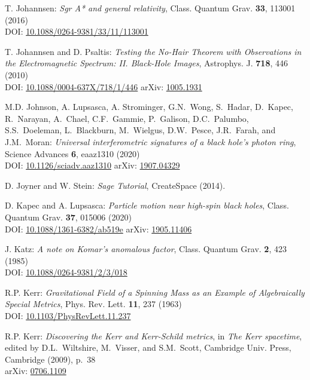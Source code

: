 \begin{thebibliography}{123}
T. Johannsen:
{\em Sgr A* and general relativity},
Class. Quantum Grav.  {\bf 33}, 113001 (2016)\\
DOI: \href{https://doi.org/10.1088/0264-9381/33/11/113001}{10.1088/0264-9381/33/11/113001}

T. Johannsen and D. Psaltis:
{\em Testing the No-Hair Theorem with Observations in the Electromagnetic Spectrum: II. Black-Hole Images},
Astrophys. J. {\bf 718}, 446 (2010)\\
DOI: \href{https://doi.org/10.1088/0004-637X/718/1/446}{10.1088/0004-637X/718/1/446}\hfill
arXiv: \href{https://arxiv.org/abs/1005.1931}{1005.1931}

M.D. Johnson, A. Lupsasca, A. Strominger, G.N.~Wong, S.~Hadar, D.~Kapec, R.~Narayan, A.~Chael,
C.F.~Gammie, P.~Galison, D.C.~Palumbo, S.S.~Doeleman, L.~Blackburn, M.~Wielgus, D.W.~Pesce,
J.R.~Farah, and J.M.~Moran:
{\em Universal interferometric signatures of a black hole's photon ring},
Science Advances {\bf 6}, eaaz1310 (2020)\\
DOI: \href{https://doi.org/10.1126/sciadv.aaz1310}{10.1126/sciadv.aaz1310}\hfill
arXiv: \href{https://arxiv.org/abs/1907.04329}{1907.04329}

D. Joyner and W. Stein: {\em Sage Tutorial}, CreateSpace (2014).

D. Kapec and A. Lupsasca:
{\em Particle motion near high-spin black holes},
Class. Quantum Grav. {\bf 37}, 015006 (2020)\\
DOI: \href{https://doi.org/10.1088/1361-6382/ab519e}{10.1088/1361-6382/ab519e}\hfill
arXiv: \href{https://arxiv.org/abs/1905.11406}{1905.11406}

J. Katz:
{\em A note on Komar's anomalous factor},
Class. Quantum Grav. {\bf 2}, 423 (1985)\\
DOI: \href{https://doi.org/10.1088/0264-9381/2/3/018}{10.1088/0264-9381/2/3/018}

R.P. Kerr:
{\em Gravitational Field of a Spinning Mass as an Example of Algebraically Special Metrics},
Phys. Rev. Lett. {\bf 11}, 237 (1963)\\
DOI: \href{https://doi.org/10.1103/PhysRevLett.11.237}{10.1103/PhysRevLett.11.237}

R.P. Kerr: {\em Discovering the Kerr and Kerr-Schild metrics},
in {\em The Kerr spacetime}, edited by D.L.~Wiltshire, M.~Visser, and S.M.~Scott,
Cambridge Univ. Press, Cambridge (2009), p.~38\\
arXiv: \href{https://arxiv.org/abs/0706.1109}{0706.1109}


\end{thebibliography}
